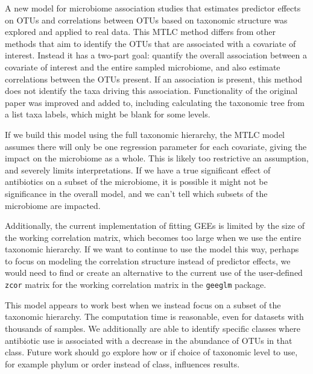 \documentclass[12pt]{article}
\begin{document}
A new model for microbiome association studies that estimates predictor effects on OTUs and correlations between OTUs based on taxonomic structure was explored and applied to real data. This MTLC method differs from other methods that aim to identify the OTUs that are associated with a covariate of interest. Instead it has a two-part goal: quantify the overall association between a covariate of interest and the entire sampled microbiome, and also estimate correlations between the OTUs present. If an association is present, this method does not identify the taxa driving this association. Functionality of the original paper was improved and added to, including calculating the taxonomic tree from a list taxa labels, which might be blank for some levels.


If we build this model using the full taxonomic hierarchy, the MTLC model assumes there will only be one regression parameter for each covariate, giving the impact on the microbiome as a whole. This is likely too restrictive an assumption, and severely limits interpretations. If we have a true significant effect of antibiotics on a subset of the microbiome, it is possible it might not be significance in the overall model, and we can't tell which subsets of the microbiome are impacted.


Additionally, the current implementation of fitting GEEs is limited by the size of the working correlation matrix, which becomes too large when we use the entire taxonomic hierarchy. If we want to continue to use the model this way, perhaps to focus on modeling the correlation structure instead of predictor effects, we would need to find or create an alternative to the current use of the user-defined \texttt{zcor} matrix for the working correlation matrix in the \texttt{geeglm} package.


This model appears to work best when we instead focus on a subset of the taxonomic hierarchy. The computation time is reasonable, even for datasets with thousands of samples. We additionally are able to identify specific classes where antibiotic use is associated with a decrease in the abundance of OTUs in that class. Future work should go explore how or if choice of taxonomic level to use, for example phylum or order instead of class, influences results. 
\end{document}
